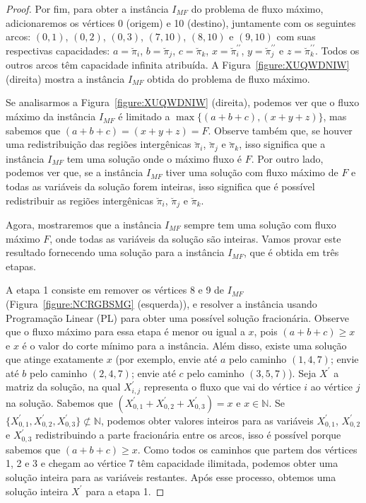 \begin{proof}
Por fim, para obter a instância $I_{MF}$ do problema de fluxo máximo, adicionaremos os vértices 0 (origem) e 10 (destino), juntamente com os seguintes arcos: $(0,1)$, $(0, 2)$, $(0,3)$, $(7,10)$, $(8,10)$ e $(9,10)$ com suas respectivas capacidades: $a=\breve\pi_i$, $b=\breve\pi_j$, $c=\breve\pi_k$, $x=\breve\pi^{\prime\prime}_i$, $y=\breve\pi^{\prime\prime}_j $ e $z=\breve\pi^{\prime\prime}_k$. Todos os outros arcos têm capacidade infinita atribuída. A Figura~\ref{figure:XUQWDNIW} (direita) mostra a instância $I_{MF}$ obtida do problema de fluxo máximo.



Se analisarmos a Figura~\ref{figure:XUQWDNIW} (direita), podemos ver que o fluxo máximo da instância $I_{MF}$ é limitado a $\max\{(a+b+c),(x+ y+z)\}$, mas sabemos que $(a+b+c) = (x+y+z) = F$. Observe também que, se houver uma redistribuição das regiões intergênicas $\breve\pi_i$, $\breve\pi_j$ e $\breve\pi_k$, isso significa que a instância $I_{MF}$ tem uma solução onde o máximo fluxo é $F$. Por outro lado, podemos ver que, se a instância $I_{MF}$ tiver uma solução com fluxo máximo de $F$ e todas as variáveis da solução forem inteiras, isso significa que é possível redistribuir as regiões intergênicas $\breve \pi_i$, $\breve\pi_j$ e $\breve\pi_k$.

Agora, mostraremos que a instância $I_{MF}$ sempre tem uma solução com fluxo máximo $F$, onde todas as variáveis da solução são inteiras. Vamos provar este resultado fornecendo uma solução para a instância $I_{MF}$, que é obtida em três etapas.

A etapa 1 consiste em remover os vértices 8 e 9 de $I_{MF}$ (Figura~\ref{figure:NCRGBSMG} (esquerda)), e resolver a instância usando Programação Linear (PL) para obter uma possível solução fracionária. Observe que o fluxo máximo para essa etapa é menor ou igual a $x$, pois $(a+b+c) \ge x$ e $x$ é o valor do corte mínimo para a instância. Além disso, existe uma solução que atinge exatamente $x$ (por exemplo, envie até $a$ pelo caminho $(1,4,7)$; envie até $b$ pelo caminho $(2,4,7)$; envie até $c$ pelo caminho $(3,5,7)$). Seja $X^{\prime}$ a matriz da solução, na qual $X^{\prime}_{i,j}$ representa o fluxo que vai do vértice $i$ ao vértice $j$ na solução. Sabemos que $(X^{\prime}_{0,1}+X^{\prime}_{0,2}+X^{\prime}_{0,3}) = x$ e $x \in \mathbb{N}$. Se $\{X^{\prime}_{0,1},X^{\prime}_{0,2},X^{\prime}_{0,3}\} \not\subset \mathbb {N}$, podemos obter valores inteiros para as variáveis $X^{\prime}_{0,1}$, $X^{\prime}_{0,2}$ e $X^{\prime }_{0,3}$ redistribuindo a parte fracionária entre os arcos, isso é possível porque sabemos que $(a+b+c) \ge x$. Como todos os caminhos que partem dos vértices 1, 2 e 3 e chegam ao vértice 7 têm capacidade ilimitada, podemos obter uma solução inteira para as variáveis restantes. Após esse processo, obtemos uma solução inteira $X^{\prime}$ para a etapa 1.


\end{proof}
